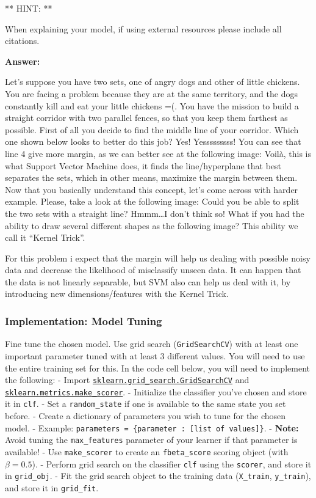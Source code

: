 \documentclass[11pt]{article}
\begin{document}
** HINT: **

When explaining your model, if using external resources please include
all citations.

    \textbf{Answer: }

Let's suppose you have two sets, one of angry dogs and other of little
chickens. You are facing a problem because they are at the same
territory, and the dogs constantly kill and eat your little chickens =(.
You have the mission to build a straight corridor with two parallel
fences, so that you keep them farthest as possible. First of all you
decide to find the middle line of your corridor. Which one shown below
looks to better do this job? Yes! Yesssssssss! You can see that line 4
give more margin, as we can better see at the following image: Voilà,
this is what Support Vector Machine does, it finds the line/hyperplane
that best separates the sets, which in other means, maximize the margin
between them. Now that you basically understand this concept, let's come
across with harder example. Please, take a look at the following image:
Could you be able to split the two sets with a straight line?
Hmmm\ldots{}I don't think so! What if you had the ability to draw
several different shapes as the following image? This ability we call it
``Kernel Trick''.

For this problem i expect that the margin will help us dealing with
possible noisy data and decrease the likelihood of misclassify unseen
data. It can happen that the data is not linearly separable, but SVM
also can help us deal with it, by introducing new dimensions/features
with the Kernel Trick.

    \subsubsection{Implementation: Model
Tuning}\label{implementation-model-tuning}

Fine tune the chosen model. Use grid search (\texttt{GridSearchCV}) with
at least one important parameter tuned with at least 3 different values.
You will need to use the entire training set for this. In the code cell
below, you will need to implement the following: - Import
\href{http://scikit-learn.org/0.17/modules/generated/sklearn.grid_search.GridSearchCV.html}{\texttt{sklearn.grid\_search.GridSearchCV}}
and
\href{http://scikit-learn.org/stable/modules/generated/sklearn.metrics.make_scorer.html}{\texttt{sklearn.metrics.make\_scorer}}.
- Initialize the classifier you've chosen and store it in \texttt{clf}.
- Set a \texttt{random\_state} if one is available to the same state you
set before. - Create a dictionary of parameters you wish to tune for the
chosen model. - Example:
\texttt{parameters\ =\ \{\textquotesingle{}parameter\textquotesingle{}\ :\ {[}list\ of\ values{]}\}}.
- \textbf{Note:} Avoid tuning the \texttt{max\_features} parameter of
your learner if that parameter is available! - Use \texttt{make\_scorer}
to create an \texttt{fbeta\_score} scoring object (with
\(\beta = 0.5\)). - Perform grid search on the classifier \texttt{clf}
using the \texttt{\textquotesingle{}scorer\textquotesingle{}}, and store
it in \texttt{grid\_obj}. - Fit the grid search object to the training
data (\texttt{X\_train}, \texttt{y\_train}), and store it in
\texttt{grid\_fit}.
\end{document}
